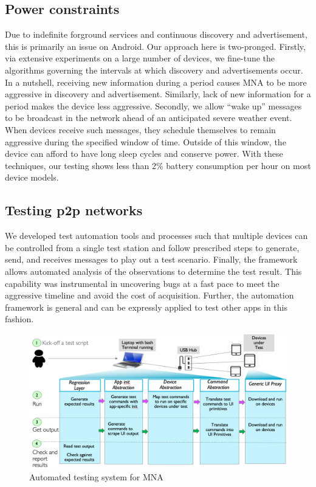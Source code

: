 \documentclass[conference]{IEEEtran}
\begin{document}
%
\subsection{Power constraints}
\label{sec:power}
%
Due to indefinite forground services and continuous discovery and
advertisement, this is primarily an issue on Android. Our approach
here is two-pronged. Firstly, via extensive experiments on a large
number of devices, we fine-tune the algorithms governing the intervals
at which discovery and advertisements occur. In a nutshell, receiving
new information during a period causes MNA to be more aggressive in
discovery and advertisement. Similarly, lack of new information for a
period makes the device less aggressive. Secondly, we allow ``wake
up'' messages to be broadcast in the network ahead of an anticipated
severe weather event. When devices receive such messages, they
schedule themselves to remain aggressive during the specified window
of time. Outside of this window, the device can afford to have long
sleep cycles and conserve power. With these techniques, our testing
shows less than 2\% battery consumption per hour on most device
models.
%
\subsection{Testing p2p networks}
\label{sec:texting}
%
We developed test automation tools and processes such that multiple
devices can be controlled from a single test station and follow
prescribed steps to generate, send, and receives messages to play out
a test scenario. Finally, the framework allows automated analysis of
the observations to determine the test result. This capability was
instrumental in uncovering bugs at a fast pace to meet the aggressive
timeline and avoid the cost of acquisition. Further, the automation
framework is general and can be expressly applied to test other apps
in this fashion.

\begin{figure}[htbp]
\centerline{\includegraphics[width=\columnwidth]{figs/test_arch}}
\caption{Automated testing system for MNA}
\label{fig:test_arch}
\end{figure}
\end{document}

